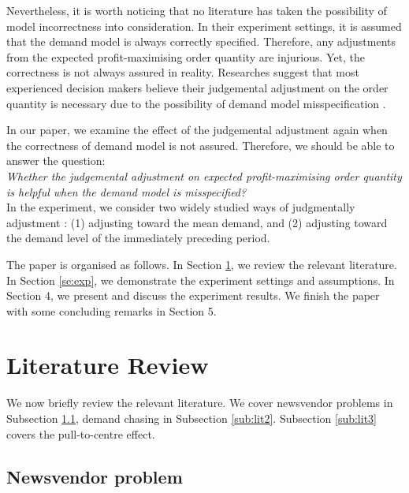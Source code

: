 \documentclass[a4paper,11pt]{article}
\begin{document}
Nevertheless, it is worth noticing that no literature has taken the possibility of model incorrectness into consideration. In their experiment settings, it is assumed that the demand model is always correctly specified. Therefore, any adjustments from the expected profit-maximising order quantity are injurious. Yet, the correctness is not always assured in reality. Researches suggest that most experienced decision makers believe their judgemental adjustment on the order quantity is necessary due to the possibility of demand model misspecification \cite{BDC92}.

In our paper, we examine the effect of the judgemental adjustment again when the correctness of demand model is not assured. Therefore, we should be able to answer the question:\\
\emph{Whether the judgemental adjustment on expected profit-maximising order quantity is helpful when the demand model is misspecified?}\\
In the experiment, we consider two widely studied ways of judgmentally adjustment \cite{BCPS08,BHS08,ZS19}: (1) adjusting toward the mean demand, and (2) adjusting toward the demand level of the immediately preceding period.

The paper is organised as follows. In Section \ref{se:lit}, we review the relevant literature.   In Section \ref{se:exp}, we  demonstrate the experiment settings and assumptions. In Section 4, we present and discuss the experiment results. We finish the paper with some concluding remarks in Section 5.

\section{Literature Review}
\label{se:lit}
We now briefly review the relevant literature. We cover newsvendor problems in Subsection \ref{sub:lit1}, demand chasing in Subsection \ref{sub:lit2}. Subsection  \ref{sub:lit3} covers the pull-to-centre effect.

\subsection{Newsvendor problem} \label{sub:lit1}
\end{document}

